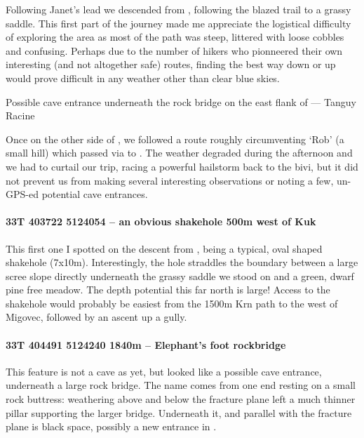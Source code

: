 Following Janet’s lead we descended from , following the blazed trail to a grassy saddle. This first part of the journey made me appreciate the logistical difficulty of exploring the area as most of the path was steep, littered with loose cobbles and confusing. Perhaps due to the number of  hikers who pionneered their own interesting (and not altogether safe) routes, finding the best way down or up would prove difficult in any weather other than clear blue skies. 


\begin{marginfigure}
        \centering
        
        \caption{Possible cave entrance underneath the rock bridge on the east flank of \protect{}  --- Tanguy Racine} \label{rockbridge}
    \end{marginfigure}
    

Once on the other side of , we followed a route roughly circumventing ‘Rob’ (a small hill) which passed via  to . The weather degraded during the afternoon and we had to curtail our trip, racing a powerful hailstorm back to the bivi, but it did not prevent us from making several interesting observations or noting a few, un-GPS-ed potential cave entrances.

\paragraph{33T 403722 5124054 – an obvious shakehole 500m west of Kuk}

This first one I spotted on the descent from , being a typical, oval shaped shakehole (7x10m). Interestingly, the hole straddles the boundary between a large scree slope directly underneath the grassy saddle we stood on and a green, dwarf pine free meadow. The depth potential this far north is large!  Access to the shakehole would probably be easiest from the 1500m Krn path to the west of Migovec, followed by an ascent up a gully. 

\paragraph{33T 404491 5124240  1840m – Elephant’s foot rockbridge}


This feature is not a cave as yet, but looked like a possible cave entrance, underneath a large rock bridge. The name comes from one end resting on a small rock buttress: weathering above and below the fracture plane left a much thinner pillar supporting the larger bridge. Underneath it, and parallel with the fracture plane is black space, possibly a new entrance in .

